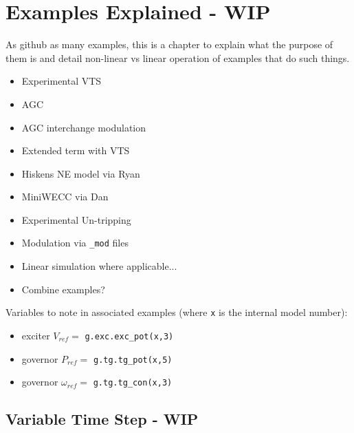 \chapter{Examples Explained - WIP}
As github as many examples, this is a chapter to explain what the purpose of them is and detail non-linear vs linear operation of examples that do such things.

\begin{itemize}
\item Experimental VTS
\item AGC
\item AGC interchange modulation
\item Extended term with VTS
\item Hiskens NE model via Ryan
\item MiniWECC via Dan
\item Experimental Un-tripping
\item Modulation via \verb|_mod| files
\item Linear simulation where applicable...
\item Combine examples? 
\end{itemize}

Variables to note in associated examples (where \verb|x| is the internal model number):
\begin{itemize}
\item exciter $V_{ref} = $ \verb|g.exc.exc_pot(x,3)|
\item governor $P_{ref} = $ \verb|g.tg.tg_pot(x,5)|
\item governor $\omega_{ref} = $ \verb|g.tg.tg_con(x,3)|
\end{itemize}


\section{Variable Time Step - WIP}